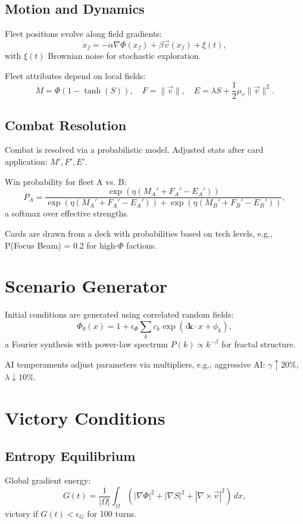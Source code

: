 \documentclass[12pt]{article}
\theoremstyle{definition}
\begin{document}
\subsection{Motion and Dynamics}
Fleet positions evolve along field gradients:
\[
\dot{x}_f = -\alpha \nabla \Phi(x_f) + \beta \vec{v}(x_f) + \xi(t),
\]
with $\xi(t)$ Brownian noise for stochastic exploration.

Fleet attributes depend on local fields:
\[
M = \Phi (1 - \tanh(S)), \quad F = \|\vec{v}\|, \quad E = \lambda S + \frac{1}{2} \mu_v \|\vec{v}\|^2.
\]

\subsection{Combat Resolution}
Combat is resolved via a probabilistic model. Adjusted stats after card application: $M', F', E'$.

Win probability for fleet A vs. B:
\[
P_A = \frac{\exp(\eta (M_A' + F_A' - E_A'))}{\exp(\eta (M_A' + F_A' - E_A')) + \exp(\eta (M_B' + F_B' - E_B'))},
\]
a softmax over effective strengths.

Cards are drawn from a deck with probabilities based on tech levels, e.g., P(Focus Beam) = 0.2 for high-$\Phi$ factions.

\section{Scenario Generator}
Initial conditions are generated using correlated random fields:
\[
\Phi_0(x) = 1 + \epsilon_\Phi \sum_k c_k \exp(i \mathbf{k} \cdot x + \phi_k),
\]
a Fourier synthesis with power-law spectrum $P(k) \propto k^{-\beta}$ for fractal structure.

AI temperaments adjust parameters via multipliers, e.g., aggressive AI: $\gamma \uparrow 20\%$, $\lambda \downarrow 10\%$.

\section{Victory Conditions}
\subsection{Entropy Equilibrium}
Global gradient energy:
\[
G(t) = \frac{1}{|\Omega|} \int_\Omega (|\nabla \Phi|^2 + |\nabla S|^2 + |\nabla \times \vec{v}|^2) \, dx,
\]
victory if $G(t) < \epsilon_G$ for 100 turns.
\end{document}
